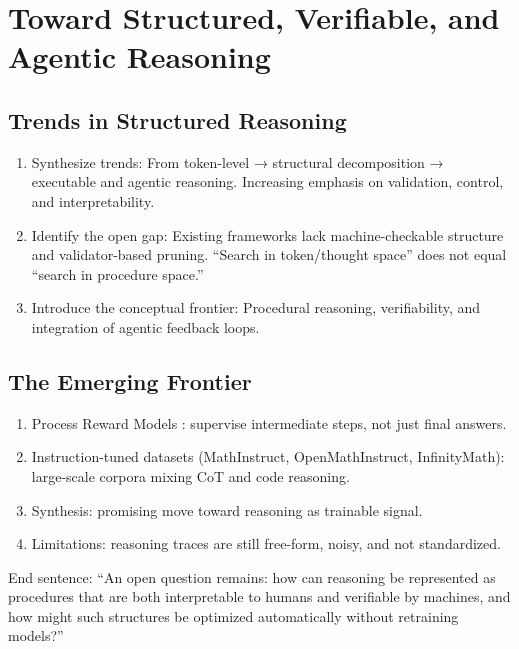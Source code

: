 \documentclass[project]{bsu-cs}  %
\begin{document}
\section{Toward Structured, Verifiable, and Agentic Reasoning}\label{sec:struct}
\subsection{Trends in Structured Reasoning}
\begin{enumerate}
    \item Synthesize trends: From token-level → structural decomposition → executable and agentic reasoning. Increasing emphasis on validation, control, and interpretability.

    \item Identify the open gap: Existing frameworks lack machine-checkable structure and validator-based pruning. “Search in token/thought space” does not equal “search in procedure space.”

    \item Introduce the conceptual frontier: Procedural reasoning, verifiability, and integration of agentic feedback loops.

\end{enumerate}
% 
\subsection{The Emerging Frontier}
\begin{enumerate}
    \item Process Reward Models \citep{lightman2023letsverifystepstep}: supervise intermediate steps, not just final answers.

    \item Instruction-tuned datasets (MathInstruct, OpenMathInstruct, InfinityMath): large-scale corpora mixing CoT and code reasoning.

    \item Synthesis: promising move toward reasoning as trainable signal.

    \item Limitations: reasoning traces are still free-form, noisy, and not standardized.
\end{enumerate}
End sentence: “An open question remains: how can reasoning be represented as procedures that are both interpretable to humans and verifiable by machines, and how might such structures be optimized automatically without retraining models?”
% 
%
%
% 
\end{document}
